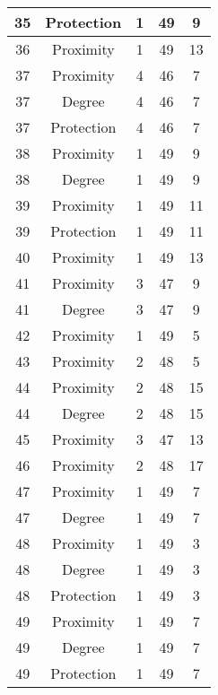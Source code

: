 \documentclass[results.tex]{subfiles}
\begin{document}
\begin{center}
\begin{tabular}{| c || c | c | c | c |}
    35 & Protection & 1 & 49 & 9 \\ 
    \hline
    36 & Proximity & 1 & 49 & 13 \\ 
    \hline
    37 & Proximity & 4 & 46 & 7 \\ 
    \hline
    37 & Degree & 4 & 46 & 7 \\ 
    \hline
    37 & Protection & 4 & 46 & 7 \\ 
    \hline
    38 & Proximity & 1 & 49 & 9 \\ 
    \hline
    38 & Degree & 1 & 49 & 9 \\ 
    \hline
    39 & Proximity & 1 & 49 & 11 \\ 
    \hline
    39 & Protection & 1 & 49 & 11 \\ 
    \hline
    40 & Proximity & 1 & 49 & 13 \\ 
    \hline
    41 & Proximity & 3 & 47 & 9 \\ 
    \hline
    41 & Degree & 3 & 47 & 9 \\ 
    \hline
    42 & Proximity & 1 & 49 & 5 \\ 
    \hline
    43 & Proximity & 2 & 48 & 5 \\ 
    \hline
    44 & Proximity & 2 & 48 & 15 \\ 
    \hline
    44 & Degree & 2 & 48 & 15 \\ 
    \hline
    45 & Proximity & 3 & 47 & 13 \\ 
    \hline
    46 & Proximity & 2 & 48 & 17 \\ 
    \hline
    47 & Proximity & 1 & 49 & 7 \\ 
    \hline
    47 & Degree & 1 & 49 & 7 \\ 
    \hline
    48 & Proximity & 1 & 49 & 3 \\ 
    \hline
    48 & Degree & 1 & 49 & 3 \\ 
    \hline
    48 & Protection & 1 & 49 & 3 \\ 
    \hline
    49 & Proximity & 1 & 49 & 7 \\ 
    \hline
    49 & Degree & 1 & 49 & 7 \\ 
    \hline
    49 & Protection & 1 & 49 & 7 \\ 
    \hline   \end{tabular}
\end{center}
\end{document}
